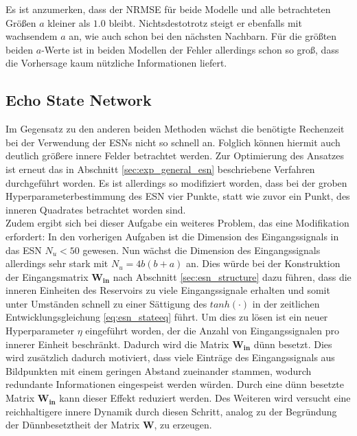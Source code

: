Es ist anzumerken, dass der NRMSE für beide Modelle und alle betrachteten Größen $a$ kleiner als $1.0$ bleibt. Nichtsdestotrotz steigt er ebenfalls mit wachsendem $a$ an, wie auch schon bei den nächsten Nachbarn. Für die größten beiden $a$-Werte ist in beiden Modellen der Fehler allerdings schon so groß, dass die Vorhersage kaum nützliche Informationen liefert.

\FloatBarrier
\subsection{Echo State Network}
Im Gegensatz zu den anderen beiden Methoden wächst die benötigte Rechenzeit bei der Verwendung der \textsc{ESN}s nicht so schnell an. Folglich können hiermit auch deutlich größere innere Felder betrachtet werden. Zur Optimierung des Ansatzes ist erneut das in Abschnitt \ref{sec:exp_general_esn} beschriebene Verfahren durchgeführt worden. Es ist allerdings so modifiziert worden, dass bei der groben Hyperparameterbestimmung des \textsc{ESN} vier Punkte, statt wie zuvor ein Punkt, des inneren Quadrates betrachtet worden sind.\\

Zudem ergibt sich bei dieser Aufgabe ein weiteres Problem, das eine Modifikation erfordert: In den vorherigen Aufgaben ist die Dimension des Eingangssignals in das \textsc{ESN} $N_u < 50$ gewesen. Nun wächst die Dimension des Eingangssignals allerdings sehr stark mit $N_u = 4b(b+a)$ an. Dies würde bei der Konstruktion der Eingangsmatrix $\mathbf{W_{in}}$ nach Abschnitt \ref{sec:esn_structure} dazu führen, dass die inneren Einheiten des Reservoirs zu viele Eingangssignale erhalten und somit unter Umständen schnell zu einer Sättigung des $tanh(\cdot)$ in der zeitlichen Entwicklungsgleichung \ref{eq:esn_stateeq} führt. Um dies zu lösen ist ein neuer Hyperparameter $\eta$ eingeführt worden, der die Anzahl von Eingangssignalen pro innerer Einheit beschränkt. Dadurch wird die Matrix $\mathbf{W_{in}}$ dünn besetzt. Dies wird zusätzlich dadurch motiviert, dass viele Einträge des Eingangssignals aus Bildpunkten mit einem geringen Abstand zueinander stammen, wodurch redundante Informationen eingespeist werden würden. Durch eine dünn besetzte Matrix $\mathbf{W_{in}}$ kann dieser Effekt reduziert werden. Des Weiteren wird versucht eine reichhaltigere innere Dynamik durch diesen Schritt, analog zu der Begründung der Dünnbesetztheit der Matrix $\mathbf{W}$, zu erzeugen.\\

